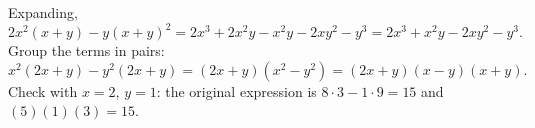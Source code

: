 Expanding,
\[2x^2(x+y)-y(x+y)^2=2x^3+2x^2y-x^2y-2xy^2-y^3=2x^3+x^2y-2xy^2-y^3.\]
Group the terms in pairs:
\[x^2(2x+y)-y^2(2x+y)=(2x+y)(x^2-y^2)=\boxed{(2x+y)(x-y)(x+y)}.\]
Check with $x=2$, $y=1$: the original expression is $8\cdot3-1\cdot9=15$ and $(5)(1)(3)=15$.
